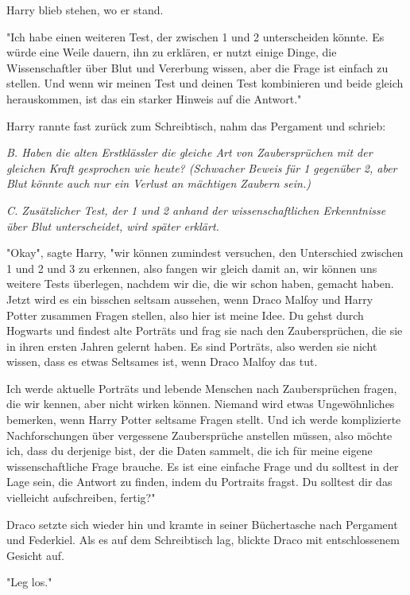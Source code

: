 {Harry blieb stehen, wo er stand.

"Ich habe einen weiteren Test, der zwischen 1 und 2 unterscheiden könnte. Es würde eine Weile dauern, ihn zu erklären, er nutzt einige Dinge, die Wissenschaftler über Blut und Vererbung wissen, aber die Frage ist einfach zu stellen. Und wenn wir meinen Test und deinen Test kombinieren und beide gleich herauskommen, ist das ein starker Hinweis auf die Antwort."

Harry rannte fast zurück zum Schreibtisch, nahm das Pergament und schrieb:

\emph{B. Haben die alten Erstklässler die gleiche Art von Zaubersprüchen mit der gleichen Kraft gesprochen wie heute? (Schwacher Beweis für 1 gegenüber 2, aber Blut könnte auch nur ein Verlust an mächtigen Zaubern sein.)}

\emph{C. Zusätzlicher Test, der 1 und 2 anhand der wissenschaftlichen Erkenntnisse über Blut unterscheidet, wird später erklärt.}

"Okay", sagte Harry, "wir können zumindest versuchen, den Unterschied zwischen 1 und 2 und 3 zu erkennen, also fangen wir gleich damit an, wir können uns weitere Tests überlegen, nachdem wir die, die wir schon haben, gemacht haben. Jetzt wird es ein bisschen seltsam aussehen, wenn Draco Malfoy und Harry Potter zusammen Fragen stellen, also hier ist meine Idee. Du gehst durch Hogwarts und findest alte Porträts und frag sie nach den Zaubersprüchen, die sie in ihren ersten Jahren gelernt haben. Es sind Porträts, also werden sie nicht wissen, dass es etwas Seltsames ist, wenn Draco Malfoy das tut.

Ich werde aktuelle Porträts und lebende Menschen nach Zaubersprüchen fragen, die wir kennen, aber nicht wirken können. Niemand wird etwas Ungewöhnliches bemerken, wenn Harry Potter seltsame Fragen stellt. Und ich werde komplizierte Nachforschungen über vergessene Zaubersprüche anstellen müssen, also möchte ich, dass du derjenige bist, der die Daten sammelt, die ich für meine eigene wissenschaftliche Frage brauche. Es ist eine einfache Frage und du solltest in der Lage sein, die Antwort zu finden, indem du Portraits fragst. Du solltest dir das vielleicht aufschreiben, fertig?"

Draco setzte sich wieder hin und kramte in seiner Büchertasche nach Pergament und Federkiel. Als es auf dem Schreibtisch lag, blickte Draco mit entschlossenem Gesicht auf.

"Leg los."

}
